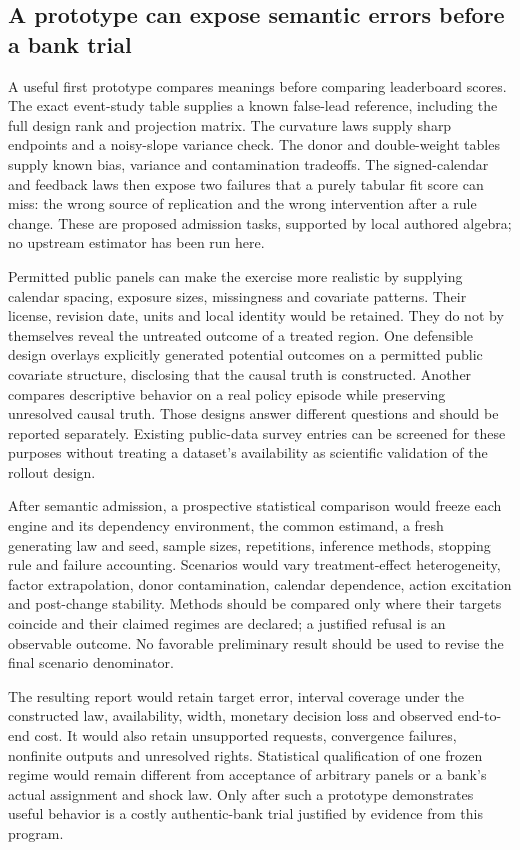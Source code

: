 \subsection{A prototype can expose semantic errors before a bank trial}
\label{exec17:s6-prototype}

A useful first prototype compares meanings before comparing leaderboard
scores. The exact event-study table supplies a known false-lead
reference, including the full design rank and projection matrix.
The curvature laws supply sharp endpoints and a noisy-slope variance
check. The donor and double-weight tables supply known bias, variance
and contamination tradeoffs. The signed-calendar and feedback laws
then expose two failures that a purely tabular fit score can miss:
the wrong source of replication and the wrong intervention after
a rule change. These are proposed admission tasks, supported by
local authored algebra; no upstream estimator has been run here.
\citep{exec17_s6_math,exec17_s6_design}

Permitted public panels can make the exercise more realistic by supplying
calendar spacing, exposure sizes, missingness and covariate patterns.
Their license, revision date, units and local identity would be retained.
They do not by themselves reveal the untreated outcome of a treated
region. One defensible design overlays explicitly generated potential
outcomes on a permitted public covariate structure, disclosing that
the causal truth is constructed. Another compares descriptive behavior
on a real policy episode while preserving unresolved causal truth.
Those designs answer different questions and should be reported
separately. Existing public-data survey entries can be screened for
these purposes without treating a dataset's availability as scientific
validation of the rollout design.

After semantic admission, a prospective statistical comparison would
freeze each engine and its dependency environment, the common
estimand, a fresh generating law and seed, sample sizes, repetitions,
inference methods, stopping rule and failure accounting. Scenarios
would vary treatment-effect heterogeneity, factor extrapolation,
donor contamination, calendar dependence, action excitation and
post-change stability. Methods should be compared only where their
targets coincide and their claimed regimes are declared; a justified
refusal is an observable outcome. No favorable preliminary result
should be used to revise the final scenario denominator.

The resulting report would retain target error, interval coverage
under the constructed law, availability, width, monetary decision
loss and observed end-to-end cost. It would also retain unsupported
requests, convergence failures, nonfinite outputs and unresolved
rights. Statistical qualification of one frozen regime would remain
different from acceptance of arbitrary panels or a bank's actual
assignment and shock law. Only after such a prototype demonstrates
useful behavior is a costly authentic-bank trial justified by evidence
from this program.~\citep{exec17_s6_design}

